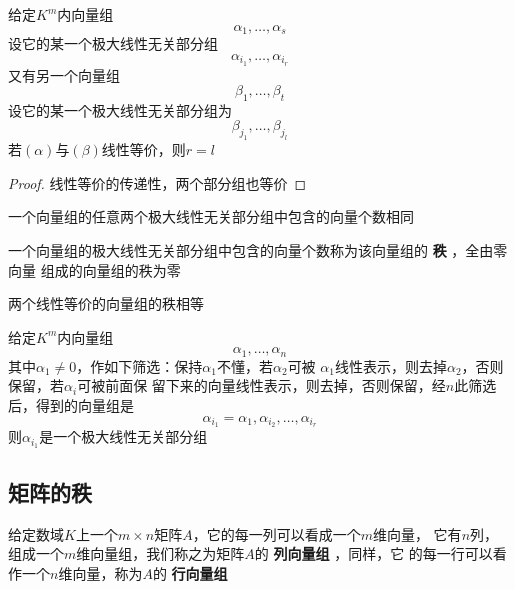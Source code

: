 \documentclass[11pt]{article}
\begin{document}
\begin{definition}[]
给定\(K^m\)内向量组
\begin{equation*}
\alpha_1,\dots,\alpha_s
\end{equation*}
设它的某一个极大线性无关部分组
\begin{equation*}
\alpha_{i_1},\dots,\alpha_{i_r}
\end{equation*}
又有另一个向量组
\begin{equation*}
\beta_1,\dots,\beta_t
\end{equation*}
设它的某一个极大线性无关部分组为
\begin{equation*}
\beta_{j_1},\dots,\beta_{j_l}
\end{equation*}
若\((\alpha)\)与\((\beta)\)线性等价，则\(r=l\)
\end{definition}

\begin{proof}
线性等价的传递性，两个部分组也等价
\end{proof}

\begin{corollary}[]
一个向量组的任意两个极大线性无关部分组中包含的向量个数相同
\end{corollary}

\begin{definition}[]
一个向量组的极大线性无关部分组中包含的向量个数称为该向量组的 \textbf{秩} ，全由零向量
组成的向量组的秩为零
\end{definition}


\begin{corollary}[]
两个线性等价的向量组的秩相等
\end{corollary}

\begin{proposition}[]
给定\(K^m\)内向量组
\begin{equation*}
\alpha_1,\dots,\alpha_n
\end{equation*}
其中\(\alpha_1\neq0\)，作如下筛选：保持\(\alpha_1\)不懂，若\(\alpha_2\)可被
\(\alpha_1\)线性表示，则去掉\(\alpha_2\)，否则保留，若\(\alpha_i\)可被前面保
留下来的向量线性表示，则去掉，否则保留，经\(n\)此筛选后，得到的向量组是
\begin{equation*}
\alpha_{i_1}=\alpha_1,\alpha_{i_2},\dots,\alpha_{i_r}
\end{equation*}
则\(\alpha_{i_1}\)是一个极大线性无关部分组
\end{proposition}
\subsection{矩阵的秩}
\label{sec:orgf2ae0b2}
给定数域\(K\)上一个\(m\times n\)矩阵\(A\)，它的每一列可以看成一个\(m\)维向量，
它有\(n\)列，组成一个\(m\)维向量组，我们称之为矩阵\(A\)的 \textbf{列向量组} ，同样，它
的每一行可以看作一个\(n\)维向量，称为\(A\)的 \textbf{行向量组}
\end{document}
